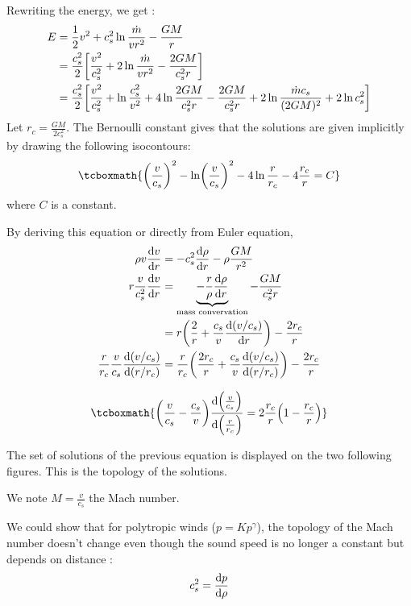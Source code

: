 \documentclass[10pt,a4paper,english,draft]{article}
\let\originalleft\left
\let\originalright\right
\renewcommand{\left}{\mathopen{}\mathclose\bgroup\originalleft}
\renewcommand{\right}{\aftergroup\egroup\originalright}
\begin{document}
Rewriting the energy, we get :
\begin{align}
  E &= \frac{1}{2}v^2 + c_s^2 \ln \frac{\dot{m}}{vr^2} - \frac{GM}{r} \\
    &= \frac{c_s^2}{2}\left[ \frac{v^2}{c_s^2} + 2\ln \frac{\dot{m}}{vr^2} - \frac{2GM}{c_s^2r}\right] \\
    &= \frac{c_s^2}{2} \left[\frac{v^2}{c_s^2} + \ln \frac{c_s^2}{v^2} + 4\ln \frac{2GM}{c_s^2r} - \frac{2GM}{c_s^2r} + 2\ln \frac{\dot{m}c_s}{(2GM)^2} + 2\ln c_s^2\right]
\end{align}
Let $r_c = \frac{GM}{2c_s^2}$. The Bernoulli constant gives that the solutions are given implicitly by drawing the following isocontours:
\begin{equation}
  \tcboxmath{
    \left( \frac{v}{c_s} \right)^2 - \ln \left( \frac{v}{c_s} \right)^2 - 4\ln \frac{r}{r_c} - 4 \frac{r_c }{r} = C
  }
\end{equation}
where $C$ is a constant.

By deriving this equation or directly from Euler equation,
\begin{align}
  \rho v \frac{\d v}{\d r}  &= -c_s^2 \frac{\d \rho}{\d r} - \rho \frac{GM}{r^2} \\
  r \frac{v}{c_s^2} \frac{\d v}{\d r} &= \underbrace{-\frac{r}{\rho}\frac{\d \rho}{\d r}}_\textrm{mass convervation} - \frac{GM}{c_s^2r} \\
                            &= r \left( \frac{2}{r} + \frac{c_s}{v} \frac{\d(v/c_s)}{\d r} \right) - \frac{2r_c }{r} \\
  \frac{r}{r_c }\frac{v}{c_s }\frac{\d (v/c_s)}{\d (r/r_c)} & = \frac{r}{r_c} \left( \frac{2r_c }{r} + \frac{c_s}{v} \frac{\d(v/c_s)}{\d(r/r_c )} \right) - \frac{2r_c }{r}
\end{align}

\begin{equation}
  \label{eq:speed_eq}
  \tcboxmath{
    \left( \frac{v}{c_s} - \frac{c_s}{v} \right) \frac{\d \left( \frac{v}{c_s} \right) }{\d \left( \frac{r}{r_c } \right) } = 2 \frac{r_c}{r} \left( 1 - \frac{r_c }{r} \right)
  }
\end{equation}

The set of solutions of the previous equation is displayed on the two following figures. This is the topology of the solutions.

We note $M = \frac{v}{c_s}$ the Mach number.

We could show that for polytropic winds ($p = Kp^\gamma$), the topology of the Mach number doesn't change even though the sound speed is no longer a constant but depends on distance :
\begin{equation}
  c_s^2 = \frac{\mathrm{d} p}{\mathrm{d} \rho}
\end{equation}
\end{document}
